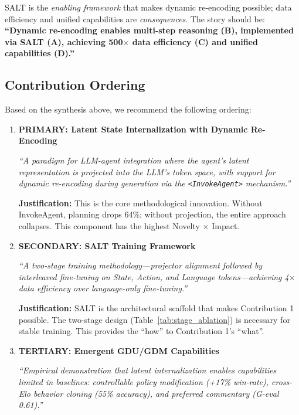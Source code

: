 SALT is the \textit{enabling framework} that makes dynamic re-encoding possible; data efficiency and unified capabilities are \textit{consequences}. The story should be: \textbf{``Dynamic re-encoding enables multi-step reasoning (B), implemented via SALT (A), achieving 500$\times$ data efficiency (C) and unified capabilities (D).''}

\subsection{Contribution Ordering}

Based on the synthesis above, we recommend the following ordering:

\begin{enumerate}[leftmargin=*, itemsep=4pt]
    \item \textbf{PRIMARY: Latent State Internalization with Dynamic Re-Encoding}
    
    \textit{``A paradigm for LLM-agent integration where the agent's latent representation is projected into the LLM's token space, with support for dynamic re-encoding during generation via the \texttt{<InvokeAgent>} mechanism.''}
    
    \textbf{Justification:} This is the core methodological innovation. Without InvokeAgent, planning drops 64\%; without projection, the entire approach collapses. This component has the highest Novelty $\times$ Impact.
    
    \item \textbf{SECONDARY: SALT Training Framework}
    
    \textit{``A two-stage training methodology—projector alignment followed by interleaved fine-tuning on State, Action, and Language tokens—achieving 4$\times$ data efficiency over language-only fine-tuning.''}
    
    \textbf{Justification:} SALT is the architectural scaffold that makes Contribution 1 possible. The two-stage design (Table~\ref{tab:stage_ablation}) is necessary for stable training. This provides the ``how'' to Contribution 1's ``what''.
    
    \item \textbf{TERTIARY: Emergent GDU/GDM Capabilities}
    
    \textit{``Empirical demonstration that latent internalization enables capabilities limited in baselines: controllable policy modification (+17\% win-rate), cross-Elo behavior cloning (55\% accuracy), and preferred commentary (G-eval 0.61).''}
    

\end{enumerate}
